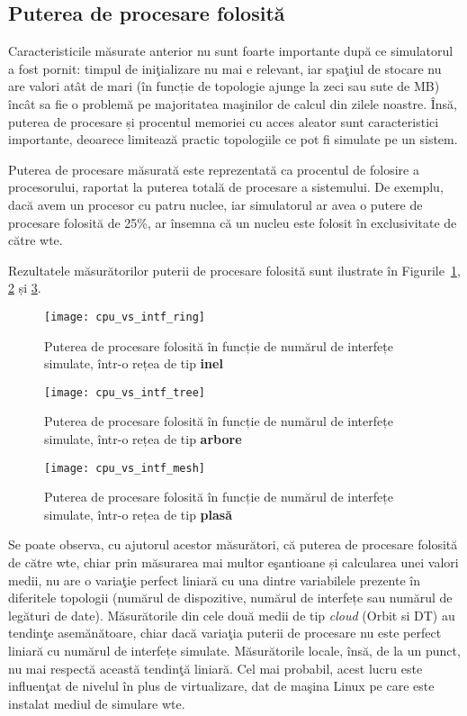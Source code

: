 \subsection{Puterea de procesare folosită}

Caracteristicile măsurate anterior nu sunt foarte importante după ce simulatorul a fost pornit: timpul de iniţializare nu mai e relevant, iar spaţiul de stocare nu are valori atât de mari (în funcție de topologie ajunge la zeci sau sute de MB) încât sa fie o problemă pe majoritatea maşinilor de calcul din zilele noastre. Însă, puterea de procesare și procentul memoriei cu acces aleator sunt caracteristici importante, deoarece limitează practic topologiile ce pot fi simulate pe un sistem.

Puterea de procesare măsurată este reprezentată ca procentul de folosire a procesorului, raportat la puterea totală de procesare a sistemului. De exemplu, dacă avem un procesor cu patru nuclee, iar simulatorul ar avea o putere de procesare folosită de 25\%, ar însemna că un nucleu este folosit în exclusivitate de către \gls{wte}.

Rezultatele măsurătorilor puterii de procesare folosită sunt ilustrate în Figurile~\ref{fig:cpu_vs_intf_ring}, \ref{fig:cpu_vs_intf_tree} și \ref{fig:cpu_vs_intf_mesh}.

\begin{figure}[hp]
	\centering
	\texttt{[image: cpu\_vs\_intf\_ring]}
	\caption{Puterea de procesare folosită în funcție de numărul de interfețe simulate, într-o rețea de tip \textbf{inel}}
	\label{fig:cpu_vs_intf_ring}
\end{figure}

\begin{figure}[hp]
	\centering
	\texttt{[image: cpu\_vs\_intf\_tree]}
	\caption{Puterea de procesare folosită în funcție de numărul de interfețe simulate, într-o rețea de tip \textbf{arbore}}
	\label{fig:cpu_vs_intf_tree}
\end{figure}

\begin{figure}[hp]
	\centering
	\texttt{[image: cpu\_vs\_intf\_mesh]}
	\caption{Puterea de procesare folosită în funcție de numărul de interfețe simulate, într-o rețea de tip \textbf{plasă}}
	\label{fig:cpu_vs_intf_mesh}
\end{figure}

Se poate observa, cu ajutorul acestor măsurători, că puterea de procesare folosită de către \gls{wte}, chiar prin măsurarea mai multor eşantioane și calcularea unei valori medii, nu are o variaţie perfect liniară cu una dintre variabilele prezente în diferitele topologii (numărul de dispozitive, numărul de interfețe sau numărul de legături de date). Măsurătorile din cele două medii de tip \textit{cloud} (Orbit si DT) au tendinţe asemănătoare, chiar dacă variaţia puterii de procesare nu este perfect liniară cu numărul de interfețe simulate. Măsurătorile locale, însă, de la un punct, nu mai respectă această tendinţă liniară. Cel mai probabil, acest lucru este influenţat de nivelul în plus de virtualizare, dat de maşina Linux pe care este instalat mediul de simulare \gls{wte}.

